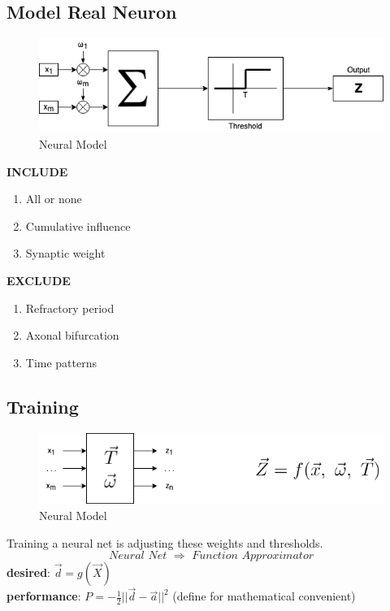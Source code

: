\documentclass[12pt]{book}
\begin{document}
 \subsection{Model Real Neuron}
 \begin{figure}[ht]
 	\centering
 	\includegraphics[scale=0.7]{Figure/Figure12_1.png}
 	\caption{Neural Model}
 \end{figure}
\textbf{INCLUDE}
\begin{enumerate}
	\item All or none
	\item Cumulative influence
	\item Synaptic weight
\end{enumerate}
\indent \indent \textbf{EXCLUDE}
\begin{enumerate}
	\item Refractory period
	\item Axonal bifurcation
	\item Time patterns
\end{enumerate}
\subsection{Training}
\begin{figure}[ht]
	\centering
	\includegraphics[scale=0.7]{Figure/Figure12_2.png}
	\caption{Neural Model}
\end{figure}
Training a neural net is adjusting these weights and thresholds.
$$Neural\,\,Net\,\,\Longrightarrow\,\,Function\,\,Approximator$$
\indent \textbf{desired}: $\vec{d}=g(\vec{X})$\\
\indent \textbf{performance}: $P=-\frac{1}{2}||\vec{d}-\vec{a}||^2$ (define for mathematical convenient)
\newpage
\end{document}
